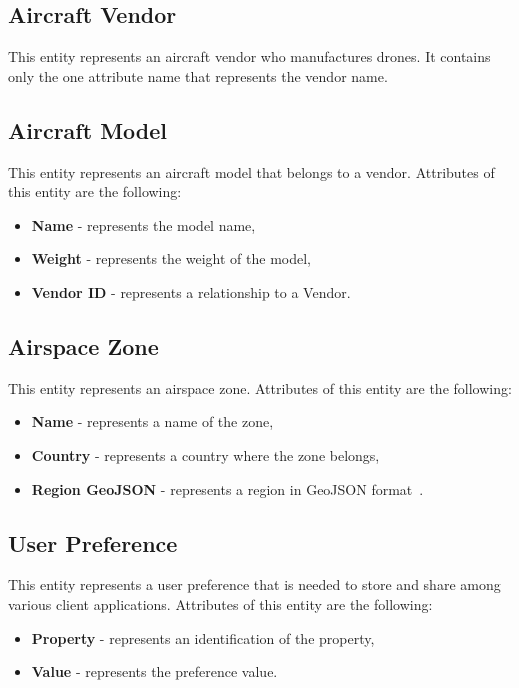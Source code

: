 \subsection{Aircraft Vendor}\label{subsec:aircraft-vendor}
This entity represents an aircraft vendor who manufactures drones.
It contains only the one attribute name that represents the vendor name.

\subsection{Aircraft Model}\label{subsec:aircraft-model}
This entity represents an aircraft model that belongs to a vendor.
Attributes of this entity are the following:
\begin{itemize}
    \item \textbf{Name} - represents the model name,
    \item \textbf{Weight} - represents the weight of the model,
    \item \textbf{Vendor ID} - represents a relationship to a Vendor.
\end{itemize}

\subsection{Airspace Zone}\label{subsec:airspace-zone}
This entity represents an airspace zone.
Attributes of this entity are the following:
\begin{itemize}
    \item \textbf{Name} - represents a name of the zone,
    \item \textbf{Country} - represents a country where the zone belongs,
    \item \textbf{Region GeoJSON} - represents a region in GeoJSON format~\cite{geoJson}.
\end{itemize}

\subsection{User Preference}\label{subsec:user-preference}
This entity represents a user preference that is needed to store and share among various client applications.
Attributes of this entity are the following:
\begin{itemize}
    \item \textbf{Property} - represents an identification of the property,
    \item \textbf{Value} - represents the preference value.
\end{itemize}

